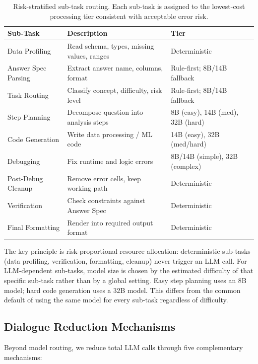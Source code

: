 \documentclass[letterpaper]{article} %
\begin{document}
\begin{table}[t]
\centering
\caption{Risk-stratified sub-task routing. Each sub-task is assigned to the lowest-cost processing tier consistent with acceptable error risk.}
\label{tab:risk_routing}
\footnotesize
\begin{tabular}{p{}p{}p{}}
\toprule
\textbf{Sub-Task} & \textbf{Description} & \textbf{Tier} \\
\midrule
Data Profiling & Read schema, types, missing values, ranges & Deterministic \\
Answer Spec Parsing & Extract answer name, columns, format & Rule-first; 8B/14B fallback \\
Task Routing & Classify concept, difficulty, risk level & Rule-first; 8B/14B fallback \\
Step Planning & Decompose question into analysis steps & 8B (easy), 14B (med), 32B (hard) \\
Code Generation & Write data processing / ML code & 14B (easy), 32B (med/hard) \\
Debugging & Fix runtime and logic errors & 8B/14B (simple), 32B (complex) \\
Post-Debug Cleanup & Remove error cells, keep working path & Deterministic \\
Verification & Check constraints against Answer Spec & Deterministic \\
Final Formatting & Render into required output format & Deterministic \\
\bottomrule
\end{tabular}
\end{table}

The key principle is risk-proportional resource allocation: deterministic sub-tasks (data profiling, verification, formatting, cleanup) never trigger an LLM call. For LLM-dependent sub-tasks, model size is chosen by the estimated difficulty of that specific sub-task rather than by a global setting. Easy step planning uses an 8B model; hard code generation uses a 32B model. This differs from the common default of using the same model for every sub-task regardless of difficulty.

\subsection{Dialogue Reduction Mechanisms}

Beyond model routing, we reduce total LLM calls through five complementary mechanisms:
\end{document}
